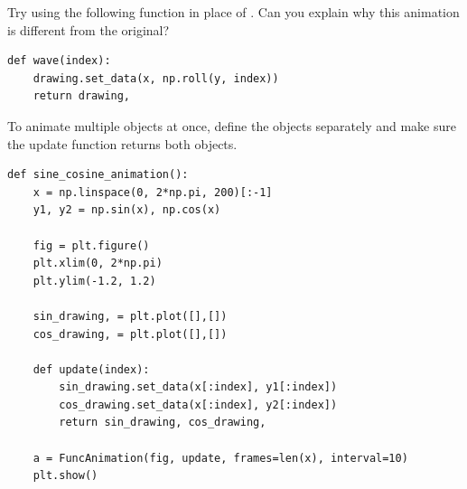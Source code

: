Try using the following function in place of .
Can you explain why this animation is different from the original?

\begin{lstlisting}
def wave(index):
    drawing.set_data(x, np.roll(y, index))
    return drawing,
\end{lstlisting}

To animate multiple objects at once, define the objects separately and make sure the update function returns both objects.

\begin{lstlisting}
def sine_cosine_animation():
    x = np.linspace(0, 2*np.pi, 200)[:-1]
    y1, y2 = np.sin(x), np.cos(x)

    fig = plt.figure()
    plt.xlim(0, 2*np.pi)
    plt.ylim(-1.2, 1.2)

    sin_drawing, = plt.plot([],[])
    cos_drawing, = plt.plot([],[])

    def update(index):
        sin_drawing.set_data(x[:index], y1[:index])
        cos_drawing.set_data(x[:index], y2[:index])
        return sin_drawing, cos_drawing,

    a = FuncAnimation(fig, update, frames=len(x), interval=10)
    plt.show()
\end{lstlisting}

